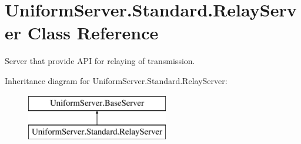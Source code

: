 \hypertarget{class_uniform_server_1_1_standard_1_1_relay_server}{}\section{Uniform\+Server.\+Standard.\+Relay\+Server Class Reference}
\label{class_uniform_server_1_1_standard_1_1_relay_server}


Server that provide A\+PI for relaying of transmission.  


Inheritance diagram for Uniform\+Server.\+Standard.\+Relay\+Server\+:\begin{figure}[H]
\begin{center}
\leavevmode
\includegraphics[height=2.000000cm]{d0/d04/class_uniform_server_1_1_standard_1_1_relay_server}
\end{center}
\end{figure}
